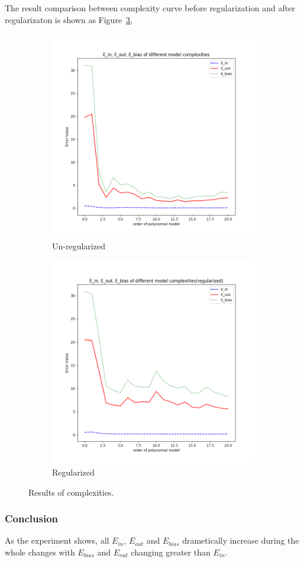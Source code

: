 \documentclass{article}
\begin{document}
The result comparison between complexity curve before regularization and after regularizaton is shown as Figure~\ref{fig:complex_reg},
\begin{figure}[h]
\centering
\begin{subfigure}{.45\textwidth}
  \centering
  \includegraphics[width=.9\linewidth]{test_d_noreg.png}
  \caption{\small Un-regularized}
  \label{fig:sub1}
\end{subfigure}
\begin{subfigure}{.45\textwidth}
  \centering
  \includegraphics[width=.9\linewidth]{test_d_regularized.png}
  \caption{\small Regularized}
  \label{fig:sub2}
\end{subfigure}
\caption{\small Results of complexities.}
\label{fig:complex_reg}
\end{figure}

\subsubsection{Conclusion}

As the experiment shows, all $E_{in}$, $E_{out}$ and $E_{bias}$ drametically increase during the whole changes with $E_{bias}$ and $E_{out}$ changing greater than $E_{in}$.



\end{document}
